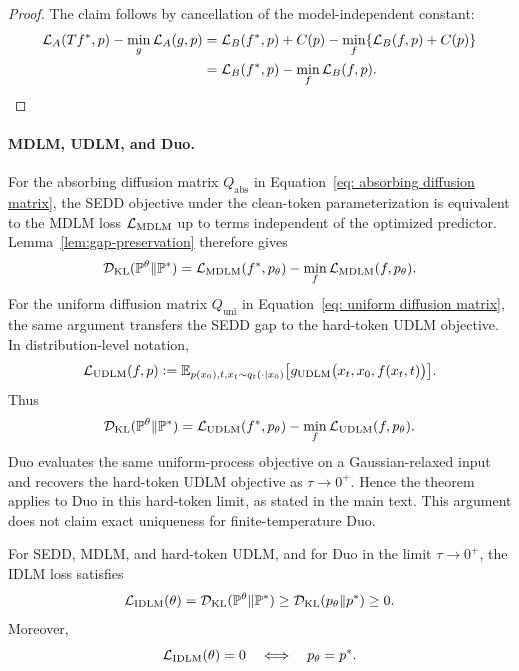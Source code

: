 \begin{proof}
The claim follows by cancellation of the model-independent constant:
\[
\begin{aligned}
    \mathcal{L}_A(Tf^*,p)-\min_g\mathcal{L}_A(g,p)
    &=
    \mathcal{L}_B(f^*,p)+C(p)
    -
    \min_f\{\mathcal{L}_B(f,p)+C(p)\}
    \\
    &=
    \mathcal{L}_B(f^*,p)-\min_f\mathcal{L}_B(f,p).
\end{aligned}
\]
\end{proof}

\paragraph{MDLM, UDLM, and Duo.}
For the absorbing diffusion matrix \(Q_{\mathrm{abs}}\) in
Equation~\eqref{eq: absorbing diffusion matrix}, the SEDD objective under the
clean-token parameterization is equivalent to the MDLM loss
\(\mathcal{L}_{\mathrm{MDLM}}\) up to terms independent of the optimized predictor.
Lemma~\ref{lem:gap-preservation} therefore gives
\[
    \mathcal{D}_{\mathrm{KL}}(\mathbb{P}^\theta\|\mathbb{P}^*)
    =
    \mathcal{L}_{\mathrm{MDLM}}(f^*,p_\theta)
    -
    \min_f \mathcal{L}_{\mathrm{MDLM}}(f,p_\theta).
\]
For the uniform diffusion matrix \(Q_{\mathrm{uni}}\) in
Equation~\eqref{eq: uniform diffusion matrix}, the same argument transfers the
SEDD gap to the hard-token UDLM objective. In distribution-level notation,
\[
    \mathcal{L}_{\mathrm{UDLM}}(f,p)
    \vcentcolon=
    \mathbb{E}_{p(x_0),t,x_t\sim q_t(\cdot\mid x_0)}
    \bigl[
      g_{\mathrm{UDLM}}\bigl(x_t,x_0,f(x_t,t)\bigr)
    \bigr].
\]
Thus
\[
    \mathcal{D}_{\mathrm{KL}}(\mathbb{P}^\theta\|\mathbb{P}^*)
    =
    \mathcal{L}_{\mathrm{UDLM}}(f^*,p_\theta)
    -
    \min_f \mathcal{L}_{\mathrm{UDLM}}(f,p_\theta).
\]
Duo evaluates the same uniform-process objective on a Gaussian-relaxed input and
recovers the hard-token UDLM objective as \(\tau\to0^+\). Hence the theorem
applies to Duo in this hard-token limit, as stated in the main text. This
argument does not claim exact uniqueness for finite-temperature Duo.

\begin{theorem}
\label{thm:unique-solution-appendix}
For SEDD, MDLM, and hard-token UDLM, and for Duo in the limit
\(\tau\to0^+\), the IDLM loss satisfies
\[
    \mathcal{L}_{\mathrm{IDLM}}(\theta)
    =
    \mathcal{D}_{\mathrm{KL}}(\mathbb{P}^\theta\|\mathbb{P}^*)
    \geq
    \mathcal{D}_{\mathrm{KL}}(p_\theta\|p^*)
    \geq 0.
\]
Moreover,
\[
    \mathcal{L}_{\mathrm{IDLM}}(\theta)=0
    \quad\Longleftrightarrow\quad
    p_\theta=p^*.
\]
\end{theorem}

